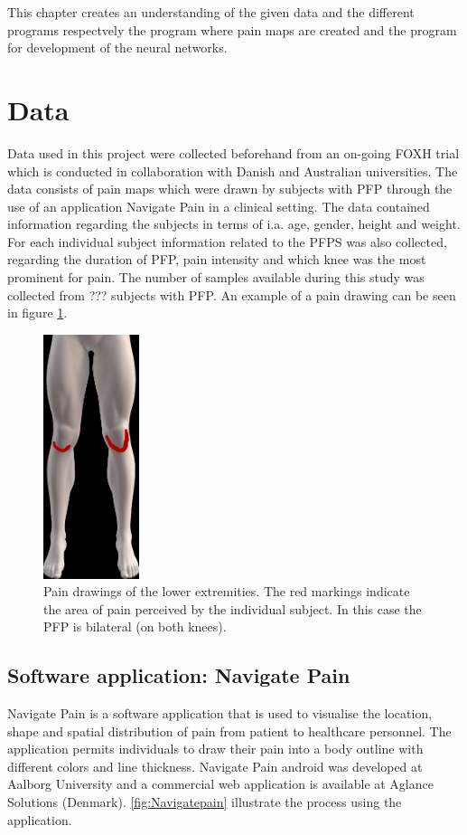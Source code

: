 This chapter creates an understanding of the given data and the different programs respectvely the program where pain maps are created and the program for development of the neural networks. 

\section{Data}
Data used in this project were collected beforehand from an on-going FOXH trial which is conducted in collaboration with Danish and Australian universities. The data consists of pain maps which were drawn by subjects with PFP through the use of an application Navigate Pain in a clinical setting. The data contained information regarding the subjects in terms of i.a. age, gender, height and weight. For each individual subject information related to the PFPS was also collected, regarding the duration of PFP, pain intensity and which knee was the most prominent for pain. 
The number of samples available during this study was collected from ??? subjects with PFP. An example of a pain drawing can be seen in figure \ref{fig:kneepainmap}. 

\begin{figure} [H]
\centering
\includegraphics[width=0.25\textwidth]{figures/kneepainmap}
\caption{Pain drawings of the lower extremities. The red markings indicate the area of pain perceived by the individual subject. In this case the PFP is bilateral (on both knees).}
\label{fig:kneepainmap}
\end{figure}

\subsection{Software application: Navigate Pain}
Navigate Pain is a software application that is used to visualise the location, shape and spatial distribution of pain from patient to healthcare personnel. The application permits individuals to draw their pain into a body outline with different colors and line thickness. Navigate Pain android was developed at Aalborg University and a commercial web application is available at Aglance Solutions (Denmark).\citep{Solutions2015}
\autoref{fig:Navigatepain} illustrate the process using the application.

